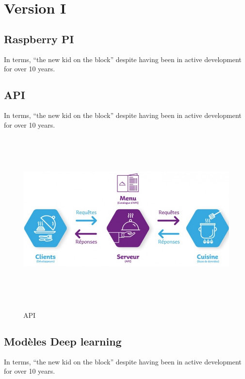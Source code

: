 {%

\pagebreak
{}

\chapter{Version I}\thispagestyle{fancy}
\section{Raspberry PI}
In terms, “the new kid on the block” despite having been in active development for over 10 years.

\section{API}
In terms, “the new kid on the block” despite having been in active development for over 10 years.
\begin{center}

\begin{figure}[h]
\includegraphics[width=18cm, height=9cm]{3-Figures/api.jpg}\\[2cm]
\caption{API}
\label{fig:figure2}
\end{figure}
\Large

\end{center}


\section{Modèles Deep learning}
In terms, “the new kid on the block” despite having been in active development for over 10 years.
}
